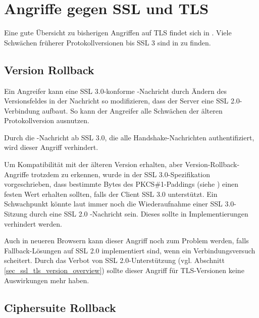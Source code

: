 
\chapter{Angriffe gegen SSL und TLS}


\label{cha_attacks}

Eine gute Übersicht zu bisherigen Angriffen auf TLS findet sich in \cite{meyer13}. Viele Schwächen früherer Protokollversionen bis SSL 3 sind in \cite{wagner96} zu finden.

\section{Version Rollback}

\label{sec_version_rollback}

Ein Angreifer kann eine SSL 3.0-konforme \clienthello{}-Nachricht durch Ändern des Versionsfeldes in der Nachricht so modifizieren, dass der Server eine SSL 2.0-Verbindung aufbaut. So kann der Angreifer alle Schwächen der älteren Protokollversion ausnutzen. 

Durch die \finished{}-Nachricht ab SSL 3.0, die alle Handshake-Nachrichten authentifiziert, wird dieser Angriff verhindert.

Um Kompatibilität mit der älteren Version erhalten, aber Version-Rollback-Angriffe trotzdem zu erkennen, wurde in der SSL 3.0-Spezifikation \cite{ssl30} vorgeschrieben, dass bestimmte Bytes des PKCS\#1-Paddings (siehe \cite{pkcs1}) einen festen Wert erhalten sollten, falls der Client SSL 3.0 unterstützt. Ein Schwachpunkt könnte laut \cite{wagner96} immer noch die Wiederaufnahme einer SSL 3.0-Sitzung durch eine SSL 2.0 \clienthello{}-Nachricht sein. Dieses sollte in Implementierungen verhindert werden.

Auch in neueren Browsern kann dieser Angriff noch zum Problem werden, falls Fallback-Lösungen auf SSL 2.0 implementiert sind, wenn ein Verbindungsversuch scheitert. Durch das Verbot von SSL 2.0-Unterstützung (vgl. Abschnitt \ref{sec_ssl_tls_version_overview}) sollte dieser Angriff für TLS-Versionen keine Auswirkungen mehr haben. 

\section{Ciphersuite Rollback}

